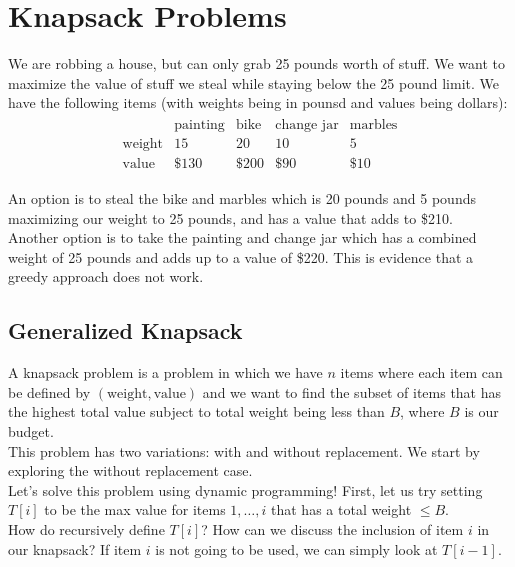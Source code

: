 \documentclass[14pt]{extarticle}
\begin{document}
    \section{Knapsack Problems}
    We are robbing a house, but can only grab 25 pounds worth of stuff. We want
    to maximize the value of stuff we steal while staying below the 25 pound
    limit. We have the following items (with weights being in pounsd and values
    being dollars):
    \begin{align*}
        \begin{matrix}
            &   \text{painting} & \text{bike} & \text{change jar} & \text{marbles}\\
            \text{weight} & 15 & 20 & 10 & 5    \\
            \text{value} & \$130 & \$200 & \$90 & \$10
        \end{matrix}
    \end{align*}
    
    An option is to steal the bike and marbles which is 20 pounds and 5 pounds
    maximizing our weight to 25 pounds, and has a value that adds to \$210.\\

    Another option is to take the painting and change jar which has a combined
    weight of 25 pounds and adds up to a value of \$220. This is evidence that
    a greedy approach does not work.

    \subsection{Generalized Knapsack}
    A knapsack problem is a problem in which we have $n$ items where each item
    can be defined by $(\text{weight}, \text{value})$ and we want to find the
    subset of items that has the highest total value subject to total
    weight being less than $B$, where $B$ is our budget.\\

    This problem has two variations: with and without replacement. We start
    by exploring the without replacement case.\\

    Let's solve this problem using dynamic programming! First, let us try
    setting $T[i]$ to be the max value for items $1, \ldots, i$ that has a
    total weight $\leq B$.\\

    How do recursively define $T[i]$? How can we discuss the inclusion of item
    $i$ in our knapsack? If item $i$ is not going to be used, we can simply
    look at $T[i-1]$.\\
\end{document}
